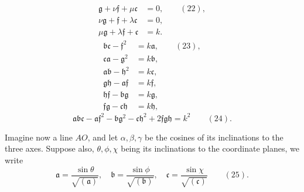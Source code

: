 \documentclass[11pt]{article}
\begin{document}
\begin{align*}
\mathfrak{g} + \nu\mathfrak{f} + \mu\mathfrak{c} &= 0, \qquad (22),\\
\nu\mathfrak{g} + \mathfrak{f} + \lambda\mathfrak{c} &= 0,\\
\mu\mathfrak{g} + \lambda\mathfrak{f} + \mathfrak{c} &= k.
\end{align*}
\begin{align*}
\mathfrak{b}\mathfrak{c} - \mathfrak{f}^2 &= k\mathfrak{a}, \qquad (23),\\
\mathfrak{c}\mathfrak{a} - \mathfrak{g}^2 &= k\mathfrak{b},\\
\mathfrak{a}\mathfrak{b} - \mathfrak{h}^2 &= k\mathfrak{c},\\
\mathfrak{g}\mathfrak{h} - \mathfrak{a}\mathfrak{f} &= k\mathfrak{f},\\
\mathfrak{h}\mathfrak{f} - \mathfrak{b}\mathfrak{g} &= k\mathfrak{g},\\
\mathfrak{f}\mathfrak{g} - \mathfrak{c}\mathfrak{h} &= k\mathfrak{h},
\end{align*}
\[
\mathfrak{a}\mathfrak{b}\mathfrak{c} - \mathfrak{a}\mathfrak{f}^2 - \mathfrak{b}\mathfrak{g}^2 - \mathfrak{c}\mathfrak{h}^2 + 2\mathfrak{f}\mathfrak{g}\mathfrak{h} = k^2 \qquad (24).
\]

\newpage
\setcounter{page}{216}

Imagine now a line $AO$, and let $\alpha, \beta, \gamma$ be the cosines of its inclinations to the three axes. Suppose also, $\theta, \phi, \chi$ being its inclinations to the coordinate planes, we write
\[
\mathfrak{a} = \frac{\sin\theta}{\sqrt{(\mathfrak{a})}}, \quad \mathfrak{b} = \frac{\sin\phi}{\sqrt{(\mathfrak{b})}}, \quad \mathfrak{c} = \frac{\sin\chi}{\sqrt{(\mathfrak{c})}} \qquad (25).
\]
\end{document}
